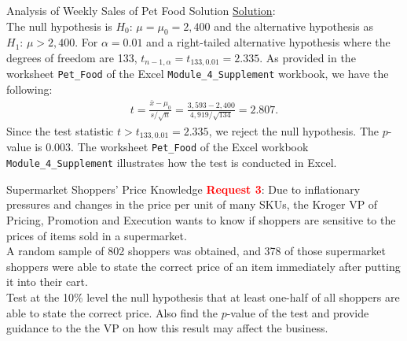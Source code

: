 \documentclass[pdf]{beamer}
\theoremstyle{remark}
\theoremstyle{definition}
\begin{document}
\begin{frame}[t]{Analysis of Weekly Sales of Pet Food Solution}
\underline{Solution}:\\
\vspace{1.5ex}
The null hypothesis is $H_0\text{: }  \mu = \mu_0 = 2,400$ and the alternative hypothesis as $H_1\text{: }  \mu > 2,400$. For $\alpha = 0.01$ and a right-tailed alternative hypothesis where the degrees of freedom are 133, $t_{n-1,\alpha} = t_{133,0.01} = 2.335$.  As provided in the worksheet \texttt{Pet\_Food} of the Excel \texttt{Module\_4\_Supplement} workbook, we have the following: 
\begin{align*}
t = \frac{\bar{x}-\mu_0}{s/\sqrt{n}} = \frac{3,593-2,400}{4,919/\sqrt{134}} = 2.807.
\end{align*}
Since the test statistic $t> t_{133,0.01} = 2.335$, we reject the null hypothesis.  The $p$-value is 0.003. The worksheet \texttt{Pet\_Food} of the Excel workbook \texttt{Module\_4\_Supplement} illustrates how the test is conducted in Excel.  
\end{frame}

\begin{frame}[t]{Supermarket Shoppers’ Price Knowledge}
\textcolor{red}{\textbf{Request 3}}: Due to inflationary pressures and changes in the price per unit of many SKUs,  the Kroger VP of Pricing, Promotion and Execution wants to know if shoppers are sensitive to the prices of items sold in a supermarket. \\
\vspace{1.5ex}
A random sample of 802 shoppers was obtained, and 378 of those supermarket shoppers were able to state the correct price of an item immediately after putting it into their cart. \\
\vspace{1.5ex}
Test at the 10\% level the null hypothesis that at least one-half of all shoppers are able to state the correct price.  Also find the $p$-value of the test and provide guidance to the the VP on how this result may affect the business. 
\end{frame}
\end{document}
